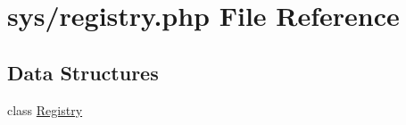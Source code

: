 \hypertarget{registry_8php}{}\section{sys/registry.php File Reference}
\label{registry_8php}
\subsection*{Data Structures}
\begin{DoxyCompactItemize}
\item 
class \hyperlink{classRegistry}{Registry}
\end{DoxyCompactItemize}
